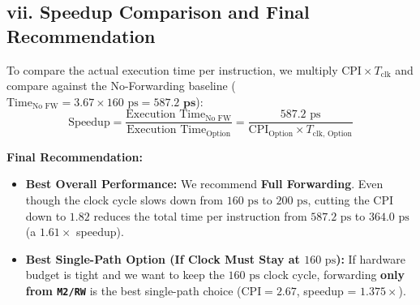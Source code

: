 \documentclass[11pt, a4paper]{article}
\begin{document}
\subsection*{vii. Speedup Comparison and Final Recommendation}

To compare the actual execution time per instruction, we multiply $\text{CPI} \times T_{\text{clk}}$ and compare against the No-Forwarding baseline ($\text{Time}_{\text{No FW}} = 3.67 \times 160\text{ ps} = \mathbf{587.2\text{ ps}}$):
\[
    \text{Speedup} = \frac{\text{Execution Time}_{\text{No FW}}}{\text{Execution Time}_{\text{Option}}} = \frac{587.2\text{ ps}}{\text{CPI}_{\text{Option}} \times T_{\text{clk, Option}}}
\]

\begin{center}
\end{center}

\textbf{Final Recommendation:}
\begin{itemize}[noitemsep, topsep=2pt]
    \item \textbf{Best Overall Performance:} We recommend \textbf{Full Forwarding}. Even though the clock cycle slows down from $160\text{ ps}$ to $200\text{ ps}$, cutting the CPI down to $1.82$ reduces the total time per instruction from $587.2\text{ ps}$ to $364.0\text{ ps}$ (a $\mathbf{1.61\times}$ speedup).
    \item \textbf{Best Single-Path Option (If Clock Must Stay at $160\text{ ps}$):} If hardware budget is tight and we want to keep the $160\text{ ps}$ clock cycle, forwarding \textbf{only from \texttt{M2/RW}} is the best single-path choice ($\text{CPI} = 2.67$, speedup = $\mathbf{1.375\times}$). 
\end{itemize}
\end{document}

